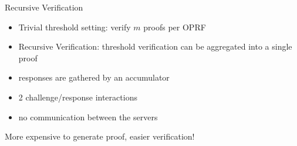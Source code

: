 \documentclass[10pt]{beamer}
\begin{document}
\begin{frame}{Recursive Verification}
  \begin{itemize}
    \item Trivial threshold setting: verify $m$ proofs per OPRF \pause
    \item Recursive Verification: threshold verification can be aggregated into
      a single proof\pause
    \item 
      responses are gathered by an accumulator\pause
    \item 
      2 challenge/response interactions
    \item 
      no communication between the servers\pause
  \end{itemize}
  \alert{More expensive to generate proof, easier verification!}
\end{frame}
\end{document}
